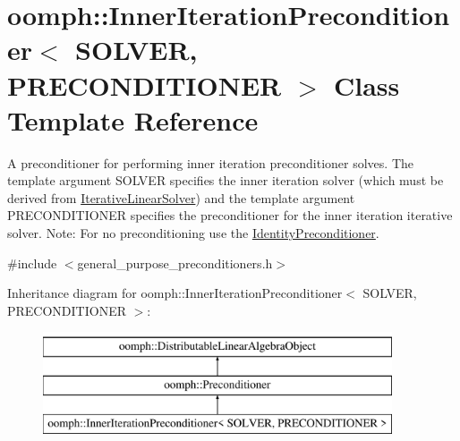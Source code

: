 \hypertarget{classoomph_1_1InnerIterationPreconditioner}{}\section{oomph\+:\+:Inner\+Iteration\+Preconditioner$<$ S\+O\+L\+V\+ER, P\+R\+E\+C\+O\+N\+D\+I\+T\+I\+O\+N\+ER $>$ Class Template Reference}
\label{classoomph_1_1InnerIterationPreconditioner}


A preconditioner for performing inner iteration preconditioner solves. The template argument S\+O\+L\+V\+ER specifies the inner iteration solver (which must be derived from \hyperlink{classoomph_1_1IterativeLinearSolver}{Iterative\+Linear\+Solver}) and the template argument P\+R\+E\+C\+O\+N\+D\+I\+T\+I\+O\+N\+ER specifies the preconditioner for the inner iteration iterative solver. Note\+: For no preconditioning use the \hyperlink{classoomph_1_1IdentityPreconditioner}{Identity\+Preconditioner}.  




{\ttfamily \#include $<$general\+\_\+purpose\+\_\+preconditioners.\+h$>$}

Inheritance diagram for oomph\+:\+:Inner\+Iteration\+Preconditioner$<$ S\+O\+L\+V\+ER, P\+R\+E\+C\+O\+N\+D\+I\+T\+I\+O\+N\+ER $>$\+:\begin{figure}[H]
\begin{center}
\leavevmode
\includegraphics[height=3.000000cm]{classoomph_1_1InnerIterationPreconditioner}
\end{center}
\end{figure}
